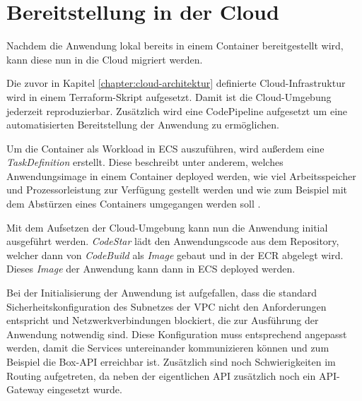 \section{Bereitstellung in der Cloud}

Nachdem die Anwendung lokal bereits in einem Container bereitgestellt wird, kann diese nun in die Cloud migriert werden.

Die zuvor in Kapitel \ref{chapter:cloud-architektur} definierte Cloud-Infrastruktur wird in einem \gls{Terraform}-Skript aufgesetzt. Damit ist die Cloud-Umgebung jederzeit reproduzierbar. Zusätzlich wird eine CodePipeline aufgesetzt um eine automatisierten Bereitstellung der Anwendung zu ermöglichen.

Um die Container als Workload in ECS auszuführen, wird außerdem eine \textit{TaskDefinition} erstellt. Diese beschreibt unter anderem, welches Anwendungsimage in einem Container deployed werden, wie viel Arbeitsspeicher und Prozessorleistung zur Verfügung gestellt werden und wie zum Beispiel mit dem Abstürzen eines Containers umgegangen werden soll \cite[Vgl.][]{AWSECS}.

Mit dem Aufsetzen der Cloud-Umgebung kann nun die Anwendung initial ausgeführt werden. \textit{CodeStar} lädt den Anwendungscode aus dem \gls{Repository}, welcher dann von \textit{CodeBuild} als \textit{Image} gebaut und in der \ac{ECR} abgelegt wird. Dieses \textit{Image} der Anwendung kann dann in \ac{ECS} deployed werden.

Bei der Initialisierung der Anwendung ist aufgefallen, dass die standard Sicherheitskonfiguration des Subnetzes der \ac{VPC} nicht den Anforderungen entspricht und Netzwerkverbindungen blockiert, die zur Ausführung der Anwendung notwendig sind. Diese Konfiguration muss entsprechend angepasst werden, damit die Services untereinander kommunizieren können und zum Beispiel die \gls{Box}-\ac{API} erreichbar ist. Zusätzlich sind noch Schwierigkeiten im Routing aufgetreten, da neben der eigentlichen \ac{API} zusätzlich noch ein \ac{API}-Gateway eingesetzt wurde.

